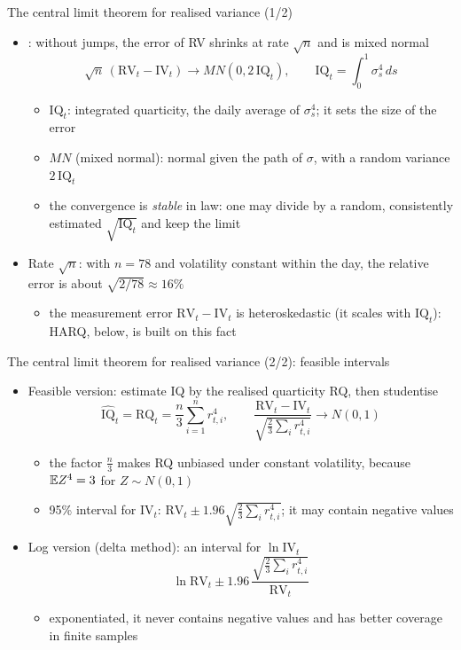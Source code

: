 \begin{frame}{The central limit theorem for realised variance (1/2)}
\itemsize{\small}
\begin{itemize}
    \item {}: without jumps, the error of RV shrinks at rate $\sqrt n$ and is mixed normal
    \[ \sqrt n\,(\mathrm{RV}_t - \mathrm{IV}_t) \to MN(0, 2\,\mathrm{IQ}_t), \qquad \mathrm{IQ}_t = \int_0^1\sigma^4_s\,ds \]
    \begin{itemize}
        \item $\mathrm{IQ}_t$: integrated quarticity, the daily average of $\sigma^4_s$; it sets the size of the error
        \item $MN$ (mixed normal): normal given the path of $\sigma$, with a random variance $2\,\mathrm{IQ}_t$
        \item the convergence is \emph{stable} in law: one may divide by a random, consistently estimated $\sqrt{\mathrm{IQ}_t}$ and keep the limit
    \end{itemize}
    \item Rate $\sqrt n$: with $n = 78$ and volatility constant within the day, the relative error is about $\sqrt{2/78} \approx 16\%$
    \begin{itemize}
        \item the measurement error $\mathrm{RV}_t - \mathrm{IV}_t$ is heteroskedastic (it scales with $\mathrm{IQ}_t$): HARQ, below, is built on this fact
    \end{itemize}
\end{itemize}
\end{frame}

\begin{frame}{The central limit theorem for realised variance (2/2): feasible intervals}
\itemsize{\small}
\begin{itemize}
    \item Feasible version: estimate IQ by the realised quarticity RQ, then studentise
    \[ \widehat{\mathrm{IQ}}_t = \mathrm{RQ}_t = \frac n3\sum_{i=1}^n r_{t,i}^4, \qquad \frac{\mathrm{RV}_t - \mathrm{IV}_t}{\sqrt{\frac23\sum_i r_{t,i}^4}} \to N(0, 1) \]
    \begin{itemize}
        \item the factor $\frac n3$ makes RQ unbiased under constant volatility, because $\mathbb{E} Z^4 = 3$ for $Z \sim N(0, 1)$
        \item 95\% interval for $\mathrm{IV}_t$: $\mathrm{RV}_t \pm 1.96\sqrt{\frac23\sum_i r_{t,i}^4}$; it may contain negative values
    \end{itemize}
    \item Log version (delta method): an interval for $\ln\mathrm{IV}_t$
    \[ \ln\mathrm{RV}_t \pm 1.96\,\frac{\sqrt{\frac23\sum_i r_{t,i}^4}}{\mathrm{RV}_t} \]
    \begin{itemize}
        \item exponentiated, it never contains negative values and has better coverage in finite samples
    \end{itemize}
\end{itemize}
\end{frame}

